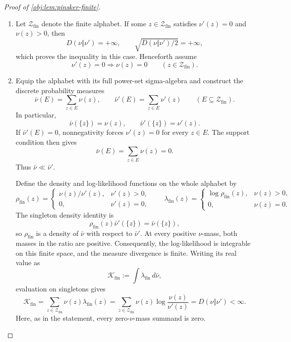 \begin{proof}[Proof of \cref{obj:lem:pinsker-finite}]
\begin{enumerate}
\item Let \(\mathcal Z_{\mathrm{fin}}\) denote the finite alphabet. If some \(z\in\mathcal Z_{\mathrm{fin}}\) satisfies \(\nu'(z)=0\) and \(\nu(z)>0\), then
\[
D(\nu\Vert\nu')=+\infty,
\qquad
\sqrt{D(\nu\Vert\nu')/2}=+\infty,
\]
which proves the inequality in this case. Henceforth assume
\[
\nu'(z)=0\Longrightarrow \nu(z)=0
\qquad(z\in\mathcal Z_{\mathrm{fin}}).
\]

\item Equip the alphabet with its full power-set sigma-algebra and construct the discrete probability measures
\[
\bar\nu(E)=\sum_{z\in E}\nu(z),
\qquad
\bar\nu'(E)=\sum_{z\in E}\nu'(z)
\qquad(E\subseteq\mathcal Z_{\mathrm{fin}}).
\]
In particular,
\[
\bar\nu(\{z\})=\nu(z),
\qquad
\bar\nu'(\{z\})=\nu'(z).
\]
If \(\bar\nu'(E)=0\), nonnegativity forces \(\nu'(z)=0\) for every \(z\in E\). The support condition then gives
\[
\bar\nu(E)=\sum_{z\in E}\nu(z)=0.
\]
Thus \(\bar\nu\ll\bar\nu'\).

Define the density and log-likelihood functions on the whole alphabet by
\[
\rho_{\mathrm{fin}}(z)=
\begin{cases}
\nu(z)/\nu'(z),&\nu'(z)>0,\\
0,&\nu'(z)=0,
\end{cases}
\qquad
\lambda_{\mathrm{fin}}(z)=
\begin{cases}
\log\rho_{\mathrm{fin}}(z),&\nu(z)>0,\\
0,&\nu(z)=0.
\end{cases}
\]
The singleton density identity is
\[
\rho_{\mathrm{fin}}(z)\bar\nu'(\{z\})
=\bar\nu(\{z\}),
\]
so \(\rho_{\mathrm{fin}}\) is a density of \(\bar\nu\) with respect to \(\bar\nu'\). At every positive \(\nu\)-mass, both masses in the ratio are positive. Consequently, the log-likelihood is integrable on this finite space, and the measure divergence is finite. Writing its real value as
\[
\mathcal K_{\mathrm{fin}}
:=\int\lambda_{\mathrm{fin}}\,d\bar\nu,
\]
evaluation on singletons gives
\[
\mathcal K_{\mathrm{fin}}
=\sum_{z\in\mathcal Z_{\mathrm{fin}}}
  \nu(z)\lambda_{\mathrm{fin}}(z)
=\sum_{z\in\mathcal Z_{\mathrm{fin}}}
  \nu(z)\log\frac{\nu(z)}{\nu'(z)}
=D(\nu\Vert\nu')<\infty.
\]
Here, as in the statement, every zero-\(\nu\)-mass summand is zero.


\end{enumerate}
\end{proof}
